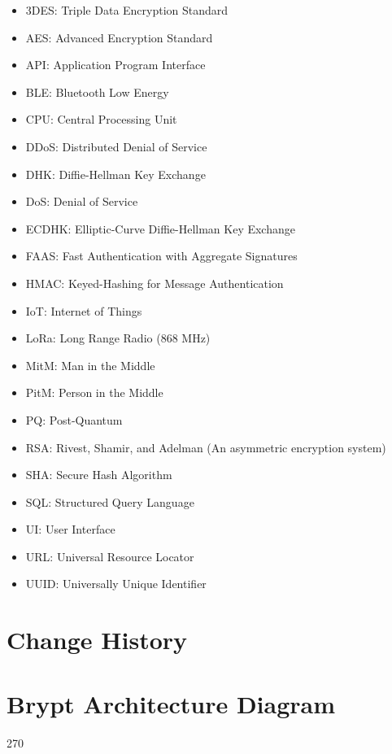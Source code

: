\documentclass[tikz,a4paper,titlepage]{article}
\begin{document}
\begin{itemize}
    \item 3DES: Triple Data Encryption Standard
    \item AES: Advanced Encryption Standard
    \item API: Application Program Interface
    \item BLE: Bluetooth Low Energy
    \item CPU: Central Processing Unit
    \item DDoS: Distributed Denial of Service
    \item DHK: Diffie-Hellman Key Exchange
    \item DoS: Denial of Service
    \item ECDHK: Elliptic-Curve Diffie-Hellman Key Exchange
    \item FAAS: Fast Authentication with Aggregate Signatures
    \item HMAC: Keyed-Hashing for Message Authentication
    \item IoT: Internet of Things
    \item LoRa: Long Range Radio (868 MHz)
    \item MitM: Man in the Middle
    \item PitM: Person in the Middle
    \item PQ: Post-Quantum
    \item RSA: Rivest, Shamir, and Adelman (An asymmetric encryption system)
    \item SHA: Secure Hash Algorithm
    \item SQL: Structured Query Language
    \item UI: User Interface
    \item URL: Universal Resource Locator
    \item UUID: Universally Unique Identifier
\end{itemize}

%
%

\section{Change History}

\newpage    
\appendix

\section{Brypt Architecture Diagram}
\vspace*{4cm}
\begin{turn}{270}
\end{turn}
\end{document}
